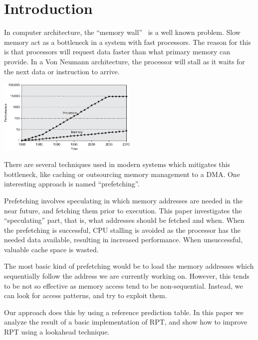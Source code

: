 \section{Introduction} %


In computer architecture, the ``memory wall''~\cite{wulf_mckee_1995}
is a well known problem. Slow memory act as a bottleneck in a system
with fast processors. The reason for this is that processors will
request data faster than what primary memory can provide. In a Von
Neumann architecture, the processor
will stall as it waits for the next data or instruction to arrive.

\begin{center}
  \includegraphics[width=0.5\textwidth]{graphs/memorywall}
\end{center}

There are several techniques used in modern systems which mitigates
this bottleneck, like caching or outsourcing memory management to a
DMA. One interesting approach is named ``prefetching''.

Prefetching involves speculating in which memory addresses are needed
in the near future, and fetching them prior to execution. This paper
investigates the ``speculating'' part, that is, what addresses should
be fetched and when. When the prefetching is successful, CPU stalling
is avoided as the processor has the needed data available, resulting
in increased performance. When unsuccessful, valuable cache space is
wasted.

The most basic kind of prefetching would be to load the memory
addresses which sequentially follow the address we are currently
working on. However, this tends to be not so effective as memory
access tend to be non-sequential. Instead, we can look for access
patterns, and try to exploit them.

Our approach does this by using a reference prediction table.  In this
paper we analyze the result of a basic implementation of RPT, and show
how to improve RPT using a lookahead technique.

